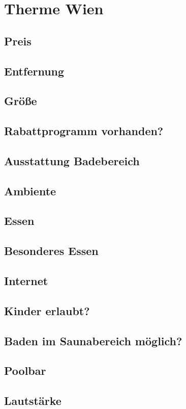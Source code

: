 \documentclass{article}
\begin{document}
\section*{Therme Wien}
\subsection*{Preis}
\subsection*{Entfernung}
\subsection*{Größe}
\subsection*{Rabattprogramm vorhanden?}
\subsection*{Ausstattung Badebereich}
\subsection*{Ambiente}
\subsection*{Essen}
\subsection*{Besonderes Essen}
\subsection*{Internet}
\subsection*{Kinder erlaubt?}
\subsection*{Baden im Saunabereich möglich?}
\subsection*{Poolbar}
\subsection*{Lautstärke}
\end{document}
